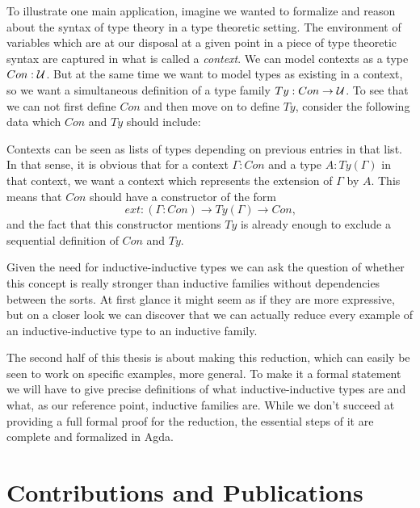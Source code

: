 To illustrate one main application, imagine we wanted to formalize and reason
about the syntax of type theory in a type theoretic setting.
The environment of variables which are at our disposal at a given point in a piece
of type theoretic syntax are captured in what is called a \emph{context}.
We can model contexts as a type $Con : \mathcal{U}$.
But at the same time we want to model types as existing in a context, so we want
a simultaneous definition of a type family $Ty : Con \to \mathcal{U}$.
To see that we can not first define $Con$ and then move on to define $Ty$, consider
the following data which $Con$ and $Ty$ should include:

Contexts can be seen as lists of types depending on previous entries in that
list.
In that sense, it is obvious that for a context $\Gamma : Con$ and a type
$A : Ty(\Gamma)$ in that context, we want a context which represents the
extension of $\Gamma$ by $A$.
This means that $Con$ should have a constructor of the form
\begin{equation*}
ext: (\Gamma : Con) \to Ty(\Gamma) \to Con \text{,}
\end{equation*}
and the fact that this constructor mentions $Ty$ is already enough to exclude
a sequential definition of $Con$ and $Ty$.

Given the need for inductive-inductive types we can ask the question of whether
this concept is really stronger than inductive families without dependencies
between the sorts.
At first glance it might seem as if they are more expressive,
but on a closer look we can discover that we can actually reduce every
example of an inductive-inductive type to an inductive family.

The second half of this thesis is about making this reduction, which can easily
be seen to work on specific examples, more general.
To make it a formal statement we will have to give precise definitions of
what inductive-inductive types are and what, as our reference point,
inductive families are.
While we don't succeed at providing a full formal proof for the reduction,
the essential steps of it are complete and formalized in Agda. %

\section{Contributions and Publications}

